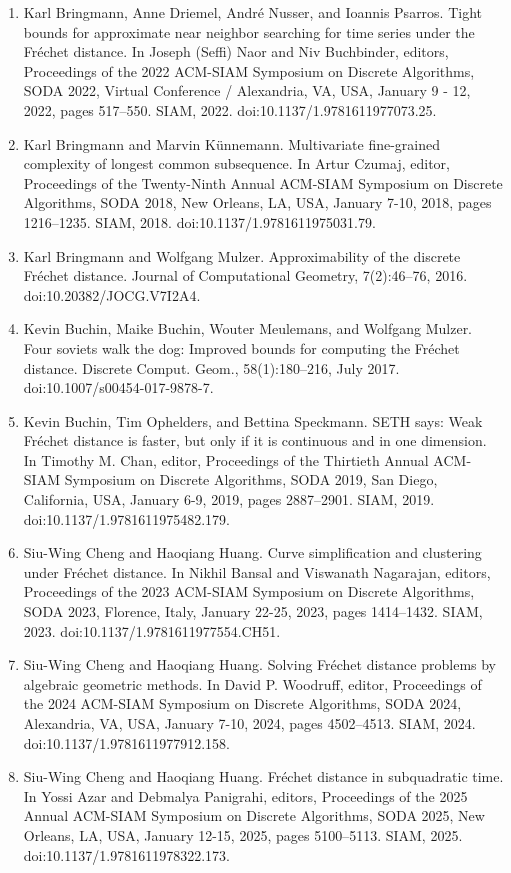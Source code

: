 \begin{enumerate}
\item[]  [8]  Karl Bringmann, Anne Driemel, André Nusser, and Ioannis Psarros.  Tight bounds for approximate near neighbor searching for time series under the Fréchet distance.  In Joseph (Seffi) Naor and Niv Buchbinder, editors, Proceedings of the 2022 ACM-SIAM Symposium on Discrete Algorithms, SODA 2022, Virtual Conference / Alexandria, VA, USA, January 9 - 12, 2022, pages 517–550. SIAM, 2022.  doi:10.1137/1.9781611977073.25.  
\item[]  [9]  Karl Bringmann and Marvin Künnemann.  Multivariate fine-grained complexity of longest common subsequence.  In Artur Czumaj, editor, Proceedings of the Twenty-Ninth Annual ACM-SIAM Symposium on Discrete Algorithms, SODA 2018, New Orleans, LA, USA, January 7-10, 2018, pages 1216–1235. SIAM, 2018.  doi:10.1137/1.9781611975031.79.  
\item[]  [10]  Karl Bringmann and Wolfgang Mulzer.  Approximability of the discrete Fréchet distance.  Journal of Computational Geometry, 7(2):46–76, 2016.  doi:10.20382/JOCG.V7I2A4.  
\item[]  [11]  Kevin Buchin, Maike Buchin, Wouter Meulemans, and Wolfgang Mulzer.  Four soviets walk the dog: Improved bounds for computing the Fréchet distance.  Discrete Comput. Geom., 58(1):180–216, July 2017.  doi:10.1007/s00454-017-9878-7.  
\item[]  [12]  Kevin Buchin, Tim Ophelders, and Bettina Speckmann.  SETH says: Weak Fréchet distance is faster, but only if it is continuous and in one dimension.  In Timothy M. Chan, editor, Proceedings of the Thirtieth Annual ACM-SIAM Symposium on Discrete Algorithms, SODA 2019, San Diego, California, USA, January 6-9, 2019, pages 2887–2901. SIAM, 2019.  doi:10.1137/1.9781611975482.179.  
\item[]  [13]  Siu-Wing Cheng and Haoqiang Huang.  Curve simplification and clustering under Fréchet distance.  In Nikhil Bansal and Viswanath Nagarajan, editors, Proceedings of the 2023 ACM-SIAM Symposium on Discrete Algorithms, SODA 2023, Florence, Italy, January 22-25, 2023, pages 1414–1432. SIAM, 2023.  doi:10.1137/1.9781611977554.CH51.  
\item[]  [14]  Siu-Wing Cheng and Haoqiang Huang.  Solving Fréchet distance problems by algebraic geometric methods.  In David P. Woodruff, editor, Proceedings of the 2024 ACM-SIAM Symposium on Discrete Algorithms, SODA 2024, Alexandria, VA, USA, January 7-10, 2024, pages 4502–4513. SIAM, 2024.  doi:10.1137/1.9781611977912.158.  
\item[]  [15]  Siu-Wing Cheng and Haoqiang Huang.  Fréchet distance in subquadratic time.  In Yossi Azar and Debmalya Panigrahi, editors, Proceedings of the 2025 Annual ACM-SIAM Symposium on Discrete Algorithms, SODA 2025, New Orleans, LA, USA, January 12-15, 2025, pages 5100–5113. SIAM, 2025.  doi:10.1137/1.9781611978322.173.  

\end{enumerate}
